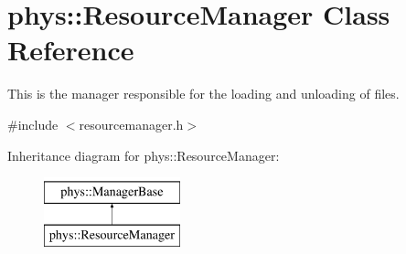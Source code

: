 \hypertarget{classphys_1_1ResourceManager}{
\section{phys::ResourceManager Class Reference}
\label{d1/d35/classphys_1_1ResourceManager}
}


This is the manager responsible for the loading and unloading of files.  




{\ttfamily \#include $<$resourcemanager.h$>$}

Inheritance diagram for phys::ResourceManager:\begin{figure}[H]
\begin{center}
\leavevmode
\includegraphics[height=2cm]{d1/d35/classphys_1_1ResourceManager}
\end{center}
\end{figure}
